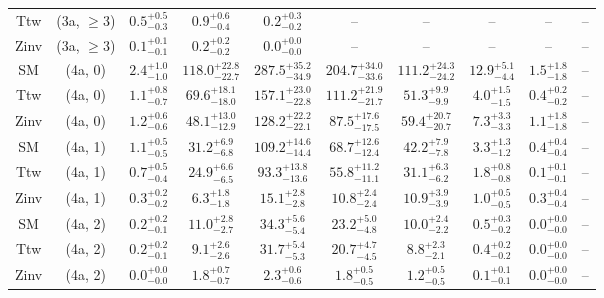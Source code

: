 \begin{table}[h!]
{\begin{tabular}{cccccccccc}
	Ttw & (3a, $\ge3$) & $0.5^{+ 0.5 }_{- 0.3 }$ & $0.9^{+ 0.6 }_{- 0.4 }$ & $0.2^{+ 0.3 }_{- 0.2 }$ & -- & -- & -- & -- & -- \\[0.5ex] 
	Zinv & (3a, $\ge3$) & $0.1^{+ 0.1 }_{- 0.1 }$ & $0.2^{+ 0.2 }_{- 0.2 }$ & $0.0^{+ 0.0 }_{- 0.0 }$ & -- & -- & -- & -- & -- \\[0.5ex] 
	SM & (4a, 0) & $2.4^{+ 1.0 }_{- 1.0 }$ & $118.0^{+ 22.8 }_{- 22.7 }$ & $287.5^{+ 35.2 }_{- 34.9 }$ & $204.7^{+ 34.0 }_{- 33.6 }$ & $111.2^{+ 24.3 }_{- 24.2 }$ & $12.9^{+ 5.1 }_{- 4.4 }$ & $1.5^{+ 1.8 }_{- 1.8 }$ & -- \\[0.5ex] 
	Ttw & (4a, 0) & $1.1^{+ 0.8 }_{- 0.7 }$ & $69.6^{+ 18.1 }_{- 18.0 }$ & $157.1^{+ 23.0 }_{- 22.8 }$ & $111.2^{+ 21.9 }_{- 21.7 }$ & $51.3^{+ 9.9 }_{- 9.9 }$ & $4.0^{+ 1.5 }_{- 1.5 }$ & $0.4^{+ 0.2 }_{- 0.2 }$ & -- \\[0.5ex] 
	Zinv & (4a, 0) & $1.2^{+ 0.6 }_{- 0.6 }$ & $48.1^{+ 13.0 }_{- 12.9 }$ & $128.2^{+ 22.2 }_{- 22.1 }$ & $87.5^{+ 17.6 }_{- 17.5 }$ & $59.4^{+ 20.7 }_{- 20.7 }$ & $7.3^{+ 3.3 }_{- 3.3 }$ & $1.1^{+ 1.8 }_{- 1.8 }$ & -- \\[0.5ex] 
	SM & (4a, 1) & $1.1^{+ 0.5 }_{- 0.5 }$ & $31.2^{+ 6.9 }_{- 6.8 }$ & $109.2^{+ 14.6 }_{- 14.4 }$ & $68.7^{+ 12.6 }_{- 12.4 }$ & $42.2^{+ 7.9 }_{- 7.8 }$ & $3.3^{+ 1.3 }_{- 1.2 }$ & $0.4^{+ 0.4 }_{- 0.4 }$ & -- \\[0.5ex] 
	Ttw & (4a, 1) & $0.7^{+ 0.5 }_{- 0.4 }$ & $24.9^{+ 6.6 }_{- 6.5 }$ & $93.3^{+ 13.8 }_{- 13.6 }$ & $55.8^{+ 11.2 }_{- 11.1 }$ & $31.1^{+ 6.3 }_{- 6.2 }$ & $1.8^{+ 0.8 }_{- 0.8 }$ & $0.1^{+ 0.1 }_{- 0.1 }$ & -- \\[0.5ex] 
	Zinv & (4a, 1) & $0.3^{+ 0.2 }_{- 0.2 }$ & $6.3^{+ 1.8 }_{- 1.8 }$ & $15.1^{+ 2.8 }_{- 2.8 }$ & $10.8^{+ 2.4 }_{- 2.4 }$ & $10.9^{+ 3.9 }_{- 3.9 }$ & $1.0^{+ 0.5 }_{- 0.5 }$ & $0.3^{+ 0.4 }_{- 0.4 }$ & -- \\[0.5ex] 
	SM & (4a, 2) & $0.2^{+ 0.2 }_{- 0.1 }$ & $11.0^{+ 2.8 }_{- 2.7 }$ & $34.3^{+ 5.6 }_{- 5.4 }$ & $23.2^{+ 5.0 }_{- 4.8 }$ & $10.0^{+ 2.4 }_{- 2.2 }$ & $0.5^{+ 0.3 }_{- 0.2 }$ & $0.0^{+ 0.0 }_{- 0.0 }$ & -- \\[0.5ex] 
	Ttw & (4a, 2) & $0.2^{+ 0.2 }_{- 0.1 }$ & $9.1^{+ 2.6 }_{- 2.6 }$ & $31.7^{+ 5.4 }_{- 5.3 }$ & $20.7^{+ 4.7 }_{- 4.5 }$ & $8.8^{+ 2.3 }_{- 2.1 }$ & $0.4^{+ 0.2 }_{- 0.2 }$ & $0.0^{+ 0.0 }_{- 0.0 }$ & -- \\[0.5ex] 
	Zinv & (4a, 2) & $0.0^{+ 0.0 }_{- 0.0 }$ & $1.8^{+ 0.7 }_{- 0.7 }$ & $2.3^{+ 0.6 }_{- 0.6 }$ & $1.8^{+ 0.5 }_{- 0.5 }$ & $1.2^{+ 0.5 }_{- 0.5 }$ & $0.1^{+ 0.1 }_{- 0.1 }$ & $0.0^{+ 0.0 }_{- 0.0 }$ & -- \\[0.5ex] 

\end{tabular}}
\end{table}
